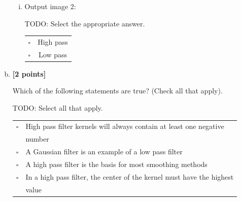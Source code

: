 \documentclass[11pt]{article}
\begin{document}
\begin{enumerate}[(a)]
\begin{enumerate}[(i)]
\item
Output image 2:\\
\begin{tcolorbox}[colback=white!5!white,colframe=green!75!black]
TODO: Select the appropriate answer. %

\begin{tabular}[h]{lc}
$\square$ & High pass \\
$\square$ & Low pass \\
\end{tabular}
\end{tcolorbox}
\end{enumerate}

\pagebreak
\item \textbf{[2 points]}
\begin{tcolorbox}[colback=orange!5!white,colframe=orange!75!black]
Which of the following statements are true? (Check all that apply).
\end{tcolorbox}

\begin{tcolorbox}[colback=white!5!white,colframe=green!75!black]
TODO: Select all that apply. %

\begin{tabular}[h]{ll}
$\square$ & High pass filter kernels will always contain at least one negative \\
& number \\
$\square$ & A Gaussian filter is an example of a low pass filter \\
$\square$ & A high pass filter is the basis for most smoothing methods \\
$\square$ & In a high pass filter, the center of the kernel must have the highest \\ 
& value \\
\end{tabular}
\end{tcolorbox}

\end{enumerate}
\end{document}
